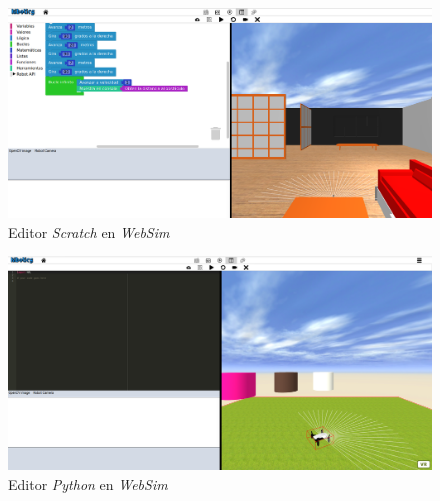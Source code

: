 \begin{figure}[h!]
    \centering
    \includegraphics[scale=0.25]{scratch.png} 
    \caption{Editor \textit{Scratch} en \textit{WebSim}}
    \label{fig:scratch}
\end{figure}

\begin{figure}[h!]
    \centering
    \includegraphics[scale=0.25]{python.png} 
    \caption{Editor \textit{Python} en \textit{WebSim}}
    \label{fig:python}
\end{figure}